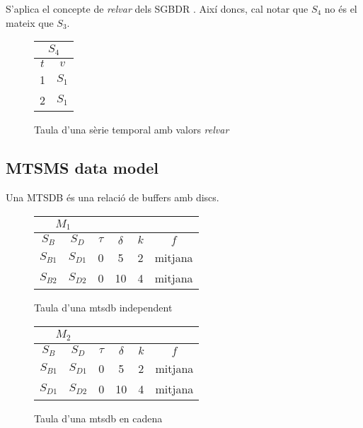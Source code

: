 S'aplica el concepte de \emph{relvar} dels SGBDR \parencite{date}.
Així doncs, cal notar que $S_4$  no és el mateix que $S_3$.
\begin{figure}[tp]
  \centering
  \begin{tabular}{|c|c|}
    \multicolumn{2}{c}{$S_4$} \\ \hline
    $t$  & $v$ \\ \hline
    1 & $S_1$ \\
    2 & $S_1$ \\ \hline
  \end{tabular}
  \caption{Taula d'una sèrie temporal amb valors \emph{relvar}}
  \label{fig:serietemporal:relvar}
\end{figure}





\subsection{MTSMS data model}

Una MTSDB és una relació de buffers amb discs. 



\begin{figure}[tp]
  \centering
  \begin{tabular}{|c|c|c|c|c|c|}
    \multicolumn{2}{c}{$M_1$} \\ \hline
    $S_B$  & $S_D$ & $\tau$ & $\delta$ & $k$ & $f$ \\ \hline
    $S_{B1}$ & $S_{D1}$ & 0 & 5  & 2 & mitjana  \\
    $S_{B2}$ & $S_{D2}$ & 0 & 10 & 4 & mitjana  \\ \hline
  \end{tabular}
  \caption{Taula d'una mtsdb independent}
  \label{fig:mtsdb:independent}
\end{figure}




\begin{figure}[tp]
  \centering
  \begin{tabular}{|c|c|c|c|c|c|}
    \multicolumn{2}{c}{$M_2$} \\ \hline
    $S_B$  & $S_D$ & $\tau$ & $\delta$ & $k$ & $f$ \\ \hline
    $S_{B1}$ & $S_{D1}$ & 0 & 5  & 2 & mitjana  \\
    $S_{D1}$ & $S_{D2}$ & 0 & 10 & 4 & mitjana  \\ \hline
  \end{tabular}
  \caption{Taula d'una mtsdb en cadena}
  \label{fig:mtsdb:cadena}
\end{figure}






